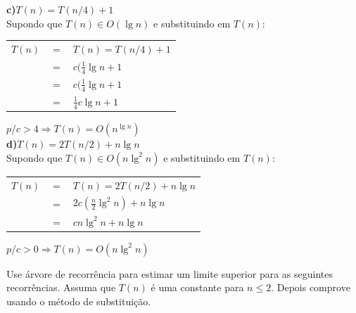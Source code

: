 \documentclass[a4paper]{exam}
\begin{document}
\begin{questions}
\begin{solution}
    \textbf{c)$T(n) = T(n/4) + 1$}\\

    Supondo que $T(n) \in O(\lg n)$ e substituindo em $T(n):$\\
    \begin{tabular}{lll}
      $T(n) $& $=$ &$ T(n) = T(n/4) + 1$ \\
      {}& $=$ &$ c(\frac{1}{4} {\lg n} + 1$\\
      {}& $=$ &$ c(\frac{1}{4} {\lg n} + 1$\\
      {}& $=$ &$ \frac{1}{4}c{\lg n} + 1$\\
    \end{tabular}

    $p/ c > 4 \Rightarrow T(n) = O(n^{\lg n})$\\

    \textbf{d)$T(n) = 2T(n/2) + n\lg n$}\\

    Supondo que $T(n) \in O(n\lg^2 n)$ e substituindo em $T(n):$\\
    \begin{tabular}{lll}
      $T(n) $& $=$ &$ T(n) = 2T(n/2) + n\lg n$ \\
      {}& $=$ &$ 2c(\frac{n}{2} \lg^2 n) + n\lg n$\\
      {}& $=$ &$ cn\lg^2 n + n\lg n$\\
    \end{tabular}

    $p/ c > 0 \Rightarrow T(n) = O(n\lg^2 n)$\\    
  \end{solution}
  \question Use árvore de recorrência para estimar um limite superior
  para as seguintes recorrências. Assuma que $T(n)$ é uma constante
  para $n \leq 2$. Depois comprove usando o método de
  substituição.
\end{questions}
\end{document}
